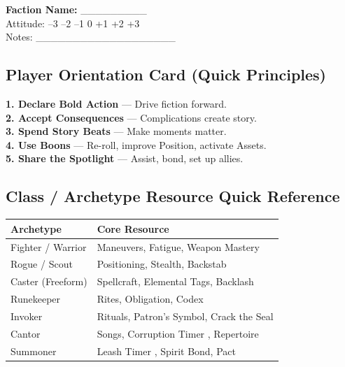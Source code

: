 \begin{tcolorbox}[colback=white,colframe=black,left=1em,right=1em,top=0.5em,bottom=0.5em,breakable]
\textbf{Faction Name:} \_\_\_\_\_\_\_\_\_ \\
Attitude: --3 --2 --1 0 +1 +2 +3 \\
Notes: \_\_\_\_\_\_\_\_\_\_\_\_\_\_\_\_\_\_\_
\end{tcolorbox}

\subsection{Player Orientation Card (Quick Principles)}

\begin{tcolorbox}[colback=white,colframe=black,left=1em,right=1em,breakable]
\textbf{1. Declare Bold Action} --- Drive fiction forward. \\
\textbf{2. Accept Consequences} --- Complications create story. \\
\textbf{3. Spend Story Beats} --- Make moments matter. \\
\textbf{4. Use Boons} --- Re-roll, improve Position, activate Assets. \\
\textbf{5. Share the Spotlight} --- Assist, bond, set up allies.
\end{tcolorbox}

\subsection{Class / Archetype Resource Quick Reference}

\centering
\begin{tabular}{|l|l|}
\hline
\textbf{Archetype} & \textbf{Core Resource} \\
\hline
Fighter / Warrior & Maneuvers, Fatigue, Weapon Mastery \\
Rogue / Scout & Positioning, Stealth, Backstab \\
Caster (Freeform) & Spellcraft, Elemental Tags, Backlash \\
Runekeeper & Rites, Obligation, Codex \\
Invoker & Rituals, Patron's Symbol, Crack the Seal \\
Cantor & Songs, Corruption Timer , Repertoire \\
Summoner & Leash Timer , Spirit Bond, Pact \\
\hline
\end{tabular}
\par

